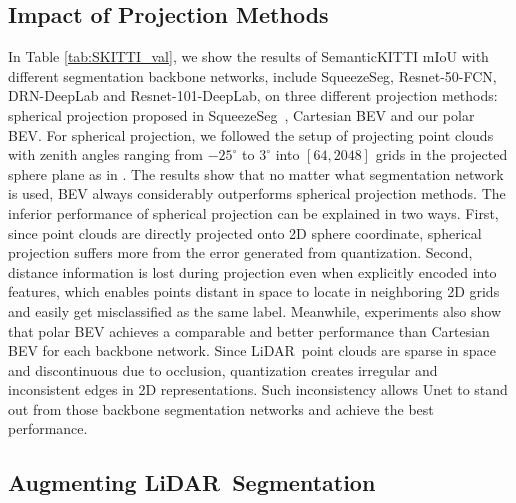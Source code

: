 \documentclass[10pt,twocolumn,letterpaper]{article}
\newcommand{\lidar}{\mbox{LiDAR }}
\begin{document}
\subsection{Impact of Projection Methods}

 In Table \ref{tab:SKITTI_val}, we show the results of SemanticKITTI mIoU with different segmentation backbone networks, include SqueezeSeg, Resnet-50-FCN, DRN-DeepLab and Resnet-101-DeepLab, on three different projection methods: spherical projection proposed in SqueezeSeg~\cite{wu2018squeezeseg}, Cartesian BEV and our polar BEV. For spherical projection, we followed the setup of projecting point clouds with zenith angles ranging from $-25^{\circ}$ to $3^{\circ}$ into $[64,2048]$ grids in the projected sphere plane as in \cite{milioto2019rangenet++}. The results show that no matter what segmentation network is used, BEV always considerably outperforms spherical projection methods. The inferior performance of spherical projection can be explained in two ways. First, since point clouds are directly projected onto 2D sphere coordinate, spherical projection suffers more from the error generated from quantization. Second, distance information is lost during projection even when explicitly encoded into features, which enables points distant in space to locate in neighboring 2D grids and easily get misclassified as the same label. Meanwhile, experiments also show that polar BEV achieves a comparable and better performance than Cartesian BEV for each backbone network. Since \lidar point clouds are sparse in space and discontinuous due to occlusion, quantization creates irregular and inconsistent edges in 2D representations. Such inconsistency allows Unet to stand out from those backbone segmentation networks and achieve the best performance.







\subsection{Augmenting \lidar Segmentation}
\end{document}
